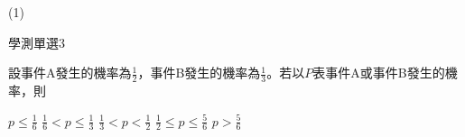 \begin{QUESTIONS}
\begin{QUESTION}
        \begin{QTAGS}\end{QTAGS}
        \begin{QANS}
            (1)
        \end{QANS}
        \begin{QSOLLIST}
        \end{QSOLLIST}
        \begin{QEMPTYSPACE}
        \end{QEMPTYSPACE}
    \end{QUESTION}
    \begin{QUESTION}
        \begin{ExamInfo}{87}{學測}{單選}{3}
        \end{ExamInfo}
        \begin{ExamAnsRateInfo}{}{}{}{}
        \end{ExamAnsRateInfo}
        \begin{QBODY}
            設事件A發生的機率為$\frac{1}{2}$，事件B發生的機率為$\frac{1}{3}$。若以$P$表事件A或事件B發生的機率，則
            \begin{QOPS}
                \QOP $p\le \frac{1}{6}$	
                \QOP $\frac{1}{6}<p\le \frac{1}{3}$
                \QOP $\frac{1}{3}<p<\frac{1}{2}$	
                \QOP $\frac{1}{2}\le p\le \frac{5}{6}$
                \QOP $p>\frac{5}{6}$
            \end{QOPS}
            

\end{QBODY}
\end{QUESTION}
\end{QUESTIONS}
